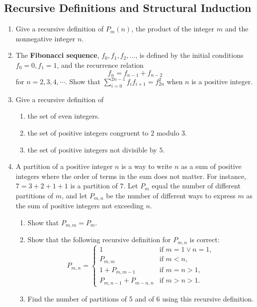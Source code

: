 \documentclass{../../cls/sig-alternate-05-2015}
\begin{document}
\subsection{Recursive Definitions and Structural Induction}
\begin{enumerate}
\item Give a recursive definition of $P_m(n)$,
the product of the integer $m$ and the nonnegative integer $n$.

\item The \textbf{Fibonacci sequence},
$f_0, f_1, f_2, \ldots$,
is defined by the initial conditions $f_0 = 0, f_1 = 1$,
and the recurrence relation \begin{equation}
    f_n = f_{n - 1} + f_{n - 2}
\end{equation} for $n = 2, 3, 4, \cdots$.
Show that $\sum_{i = 0}^{2n - 1} f_i f_{i + 1} = f_{2n}^2$ when $n$ is a positive integer.

\item Give a recursive definition of
\begin{enumerate}
    \item the set of even integers.
    \item the set of positive integers congruent to $2$ modulo $3$.
    \item the set of positive integers not divisible by $5$.
\end{enumerate}


\item A partition of a positive integer $n$ is a way to write $n$ as a sum of positive integers where the order of terms in
the sum does not matter.
For instance, $7 = 3 + 2 + 1 + 1$ is a partition of $7$.
Let $P_m$ equal the number of different partitions of $m$,
and let $P_{m, n}$ be the number of different ways to express $m$ as the sum of positive integers not exceeding $n$. \begin{enumerate}
    \item Show that $P_{m, m} = P_m$.
    \item Show that the following recursive definition for $P_{m, n}$ is correct: \begin{equation}
        P_{m, n} = \begin{cases}
        1 & \text{if } m = 1 \lor n = 1,\\
        P_{m, m} & \text{if } m < n,\\
        1 + P_{m, m - 1} & \text{if } m = n > 1,\\
        P_{m, n - 1} + P_{m - n, n} & \text{if } m > n > 1.
        \end{cases}
    \end{equation}
    \item Find the number of partitions of 5 and of 6 using this recursive definition.
\end{enumerate}


\end{enumerate}
\end{document}
